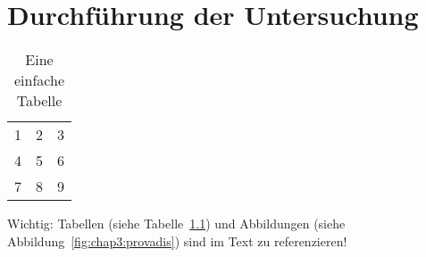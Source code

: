 %

\chapter{Durchführung der Untersuchung}

\begin{table}[h]
    \centering
    \begin{tabular}{| l c r |}
        \hline
        1 & 2 & 3 \\
        4 & 5 & 6 \\
        7 & 8 & 9 \\
        \hline
    \end{tabular}
    \caption{Eine einfache Tabelle}
    \label{tab:chap4:simpel}
\end{table}

Wichtig: Tabellen (siehe Tabelle~\ref{tab:chap4:simpel}) und Abbildungen (siehe Abbildung~\ref{fig:chap3:provadis}) sind im Text zu referenzieren!
